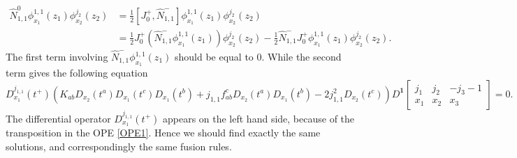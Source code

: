 \documentclass[10pt,a4paper]{article}
\theoremstyle{definition}
\theoremstyle{plain}
\theoremstyle{remark}
\numberwithin{equation}{section}
\begin{document}
\begin{equation}
    \begin{aligned}
            \hat{N}^{0}_{1,1} \phi^{1,1}_{x_{1}}(z_{1}) \phi^{j_{2}}_{x_{2}} (z_{2}) &= \frac{1}{2} \left[ J^{+}_{0}, \hat{N}^{-}_{1,1} \right] \phi^{1,1}_{x_{1}}(z_{1}) \phi^{j_{2}}_{x_{2}} (z_{2}) \\
            &= \frac{1}{2} J^{+}_{0} \left(\hat{N}^{-}_{1,1} \phi^{1,1}_{x_{1}}(z_{1}) \right) \phi^{j_{2}}_{x_{2}}(z_{2}) - \frac{1}{2} \hat{N}^{-}_{1,1} J^{+}_{0} \phi^{1,1}_{x_{1}}(z_{1}) \phi^{j_{2}}_{x_{2}}(z_{2}).
    \end{aligned}
\end{equation}
The first term involving $ \hat{N}^{-}_{1,1} \phi^{1,1}_{x_{1}}(z_{1})$ should be equal to 0. While the second term gives the following equation 
\begin{equation}
    D^{j_{1,1}}_{x_{1}}(t^{+}) \left( K_{a b} D_{x_2}\left(t^a\right) D_{x_1}\left(t^c\right) D_{x_1}\left(t^b\right)+ j_{1,1} f_{a b}^c D_{x_2}\left(t^a\right) D_{x_1}\left(t^b\right) 
    - 2 j_{1,1}^2 D_{x_2}\left(t^c\right) \right) D^{\mathbf{1}} \left[\begin{array}{ccc}
    j_{1} & j_2 & -j_3-1 \\
    x_1 & x_2 & x_3
    \end{array} \right] = 0.
\end{equation}
The differential operator $D^{j_{1,1}}_{x_{1}}(t^{+})$ appears on the left hand side, because of the transposition in the OPE \ref{OPE1}.
Hence we should find exactly the same solutions, and correspondingly the same fusion rules.


\printbibliography 
\end{document}
